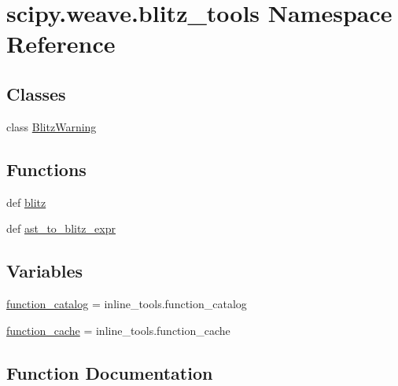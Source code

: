 \hypertarget{namespacescipy_1_1weave_1_1blitz__tools}{}\section{scipy.\+weave.\+blitz\+\_\+tools Namespace Reference}
\label{namespacescipy_1_1weave_1_1blitz__tools}
\subsection*{Classes}
\begin{DoxyCompactItemize}
\item 
class \hyperlink{classscipy_1_1weave_1_1blitz__tools_1_1BlitzWarning}{Blitz\+Warning}
\end{DoxyCompactItemize}
\subsection*{Functions}
\begin{DoxyCompactItemize}
\item 
def \hyperlink{namespacescipy_1_1weave_1_1blitz__tools_a0361477ff848b26201936972bd2ca4a4}{blitz}
\item 
def \hyperlink{namespacescipy_1_1weave_1_1blitz__tools_ad5aca479f80e124748a8c1fd4e653c0e}{ast\+\_\+to\+\_\+blitz\+\_\+expr}
\end{DoxyCompactItemize}
\subsection*{Variables}
\begin{DoxyCompactItemize}
\item 
\hyperlink{namespacescipy_1_1weave_1_1blitz__tools_a62d30ed80a44ead3ae844022b583ce12}{function\+\_\+catalog} = inline\+\_\+tools.\+function\+\_\+catalog
\item 
\hyperlink{namespacescipy_1_1weave_1_1blitz__tools_ac701dcad4d0c8f08ccd82851b732d222}{function\+\_\+cache} = inline\+\_\+tools.\+function\+\_\+cache
\end{DoxyCompactItemize}


\subsection{Function Documentation}
\hypertarget{namespacescipy_1_1weave_1_1blitz__tools_ad5aca479f80e124748a8c1fd4e653c0e}{}
